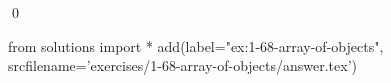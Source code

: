 
\begin{ex}
  \label{ex:1-68-array-of-objects}
  
  \qed
\end{ex}
\begin{python0}
from solutions import *
add(label="ex:1-68-array-of-objects",
    srcfilename='exercises/1-68-array-of-objects/answer.tex')
\end{python0}
